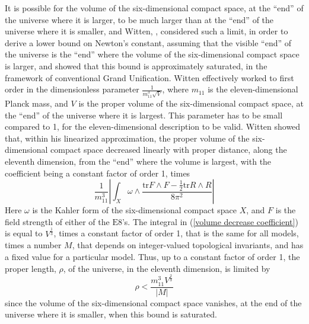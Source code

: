 \documentclass[a4paper,12pt,oneside]{article}
\begin{document}
It is possible for the volume of the six-dimensional compact
space, at the ``end'' of the universe where it is larger, to be 
much larger than at the ``end'' of the universe where it is smaller,
and Witten, \cite{Witten}, considered such a limit, in order to
derive a lower bound on Newton's constant, assuming that the 
visible ``end'' of the universe is the ``end'' where the volume of 
the six-dimensional compact space is larger, and showed that this 
bound is approximately saturated, in the framework of conventional 
Grand Unification.  Witten effectively worked to first order in the 
dimensionless parameter $\frac{1}{m_{11}^3\sqrt{V}}$, where $m_{11}$
is the eleven-dimensional Planck mass, and $V$ is the proper
volume of the six-dimensional compact space, at the ``end'' of the 
universe where it is largest.  This parameter has to
be small compared to 1, for the eleven-dimensional description to be
valid.  Witten showed that, within his linearized approximation, the
proper volume of the six-dimensional compact space decreased 
linearly with proper distance, along the eleventh dimension, from 
the ``end'' where the volume is largest, with the coefficient being 
a constant factor of order 1, times
\begin{equation}\label{volume decrease coefficient}
\frac{1}{m_{11}^3}\left\vert\int_X\omega\wedge\frac{\mathrm{tr}F
\wedge F - \frac{1}{2}\mathrm{tr}R\wedge R}{8\pi^2}\right\vert
\end{equation}
Here $\omega$ is the Kahler form of the six-dimensional compact 
space $X$, and $F$ is the field strength of either of the 
$\mathrm{E}8$'s.  The integral in
(\ref{volume decrease coefficient}) is equal to 
$V^{\frac{1}{3}}$, times a constant factor of order 1, that is the 
same for all models, times a number $M$, that depends on 
integer-valued topological invariants, and has a fixed value for a
particular model.  Thus, up to a constant 
factor of order 1, the proper length, $\rho$, of the universe, in 
the eleventh dimension, is limited by
\begin{equation}\label{limit on rho}
\rho < \frac{m_{11}^3V^{\frac{2}{3}}}{\vert M\vert}
\end{equation}
since the volume of the six-dimensional compact space vanishes, at
the end of the universe where it is smaller, when this bound is
saturated.
\end{document}
